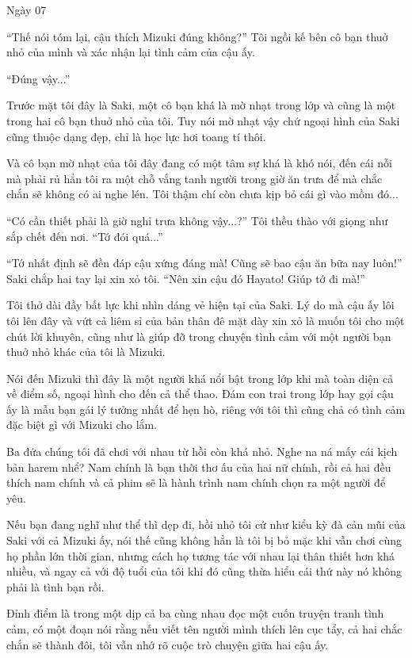 {Ngày 07}
{

``Thế nói tóm lại, cậu thích Mizuki đúng không?'' Tôi ngồi kế bên cô bạn
thuở nhỏ của mình và xác nhận lại tình cảm của cậu ấy.

``Đúng vậy...''

Trước mặt tôi đây là Saki, một cô bạn khá là mờ nhạt trong lớp và cũng
là một trong hai cô bạn thuở nhỏ của tôi. Tuy nói mờ nhạt vậy chứ ngoại
hình của Saki cũng thuộc dạng đẹp, chỉ là học lực hơi toang tí thôi.

Và cô bạn mờ nhạt của tôi đây đang có một tâm sự khá là khó nói, đến cái
nỗi mà phải rủ hẳn tôi ra một chỗ vắng tanh người trong giờ ăn trưa để
mà chắc chắn sẽ không có ai nghe lén. Tôi thậm chí còn chưa kịp bỏ cái
gì vào mồm đó...

``Có cần thiết phải là giờ nghỉ trưa không vậy...?'' Tôi thều thào với
giọng như sắp chết đến nơi. ``Tớ đói quá...''

``Tớ nhất định sẽ đền đáp cậu xứng đáng mà! Cũng sẽ bao cậu ăn bữa nay
luôn!'' Saki chắp hai tay lại xin xỏ tôi. ``Nên xin cậu đó Hayato! Giúp
tớ đi mà!''

Tôi thở dài đầy bất lực khi nhìn dáng vẻ hiện tại của Saki. Lý do mà cậu
ấy lôi tôi lên đây và vứt cả liêm sỉ của bản thân đê mặt dày xin xỏ là
muốn tôi cho một chút lời khuyên, cũng như là giúp đỡ trong chuyện tình
cảm với một người bạn thuở nhỏ khác của tôi là Mizuki.

Nói đến Mizuki thì đây là một người khá nổi bật trong lớp khi mà toàn
diện cả về điểm số, ngoại hình cho đến cả thể thao. Đám con trai trong
lớp hay gọi cậu ấy là mẫu bạn gái lý tưởng nhất để hẹn hò, riêng với tôi
thì cũng chả có tình cảm đặc biệt gì với Mizuki cho lắm.

Ba đứa chúng tôi đã chơi với nhau từ hồi còn khá nhỏ. Nghe na ná mấy cái
kịch bản harem nhể? Nam chính là bạn thời thơ ấu của hai nữ chính, rồi
cả hai đều thích nam chính và cả phim sẽ là hành trình nam chính chọn ra
một người để yêu.

Nếu bạn đang nghĩ như thể thì dẹp đi, hồi nhỏ tôi cứ như kiểu kỳ đà cản
mũi của Saki với cả Mizuki ấy, nói thế cũng không hẳn là tôi bị bỏ mặc
khi vẫn chơi cùng họ phần lớn thời gian, nhưng cách họ tương tác với
nhau lại thân thiết hơn khá nhiều, và ngay cả với độ tuổi của tôi khi đó
cũng thừa hiểu cái thứ này nó không phải là tình bạn rồi.

Đỉnh điểm là trong một dịp cả ba cùng nhau đọc một cuốn truyện tranh
tình cảm, có một đoạn nói rằng nếu viết tên người mình thích lên cục
tẩy, cả hai chắc chắn sẽ thành đôi, tôi vẫn nhớ rõ cuộc trò chuyện giữa
hai cậu ấy.

}
